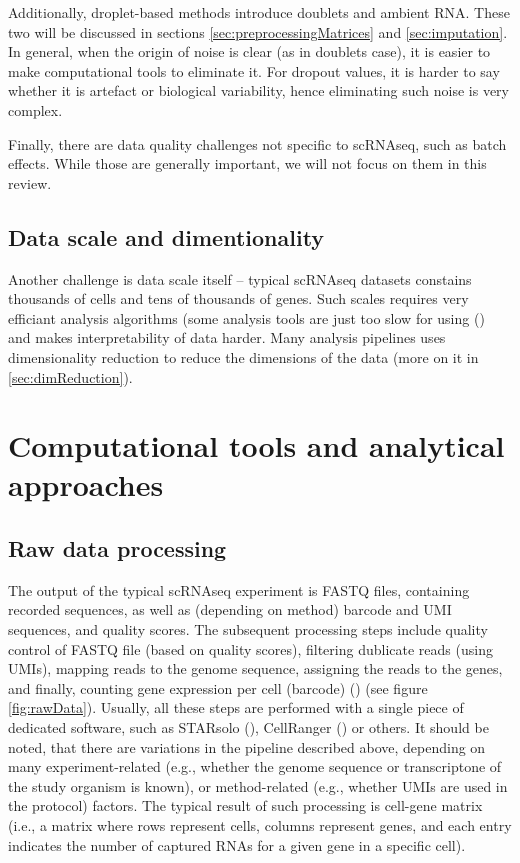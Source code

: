 Additionally, droplet-based methods introduce doublets and ambient RNA.
These two will be discussed in sections \ref{sec:preprocessingMatrices} and \ref{sec:imputation}.
In general, when the origin of noise is clear (as in doublets case), it is easier to make computational tools to eliminate it.
For dropout values, it is harder to say whether it is artefact or biological variability, hence eliminating such noise is very complex.

Finally, there are data quality challenges not specific to scRNAseq, such as batch effects.
While those are generally important, we will not focus on them in this review.

\subsection{Data scale and dimentionality}

Another challenge is data scale itself – typical scRNAseq datasets constains thousands of cells and tens of thousands of genes.
Such scales requires very efficiant analysis algorithms (some analysis tools are just too slow for using (\cite{McCalla2023})
and makes interpretability of data harder.
Many analysis pipelines uses dimensionality reduction to reduce the dimensions of the data (more on it in \ref{sec:dimReduction}).

\section{Computational tools and analytical approaches}

\subsection{Raw data processing}

The output of the typical scRNAseq experiment is FASTQ files, containing recorded sequences,
as well as (depending on method) barcode and UMI sequences, and quality scores.
The subsequent processing steps include quality control of FASTQ file (based on quality scores),
filtering dublicate reads (using UMIs), mapping reads to the genome sequence, assigning the reads to the genes,
and finally, counting gene expression per cell (barcode) (\cite{Heumos2023}) (see figure \ref{fig:rawData}).
Usually, all these steps are performed with a single piece of dedicated software,
such as STARsolo (\cite{Kaminow2021}), CellRanger (\cite{Zheng2017}) or others.
It should be noted, that there are variations in the pipeline described above,
depending on many experiment-related (e.g., whether the genome sequence or transcriptone of the study organism is known),
or method-related (e.g., whether UMIs are used in the protocol) factors.
The typical result of such processing is cell-gene matrix (i.e., a matrix where rows represent cells,
columns represent genes, and each entry indicates the number of captured RNAs for a given gene in a specific cell).

